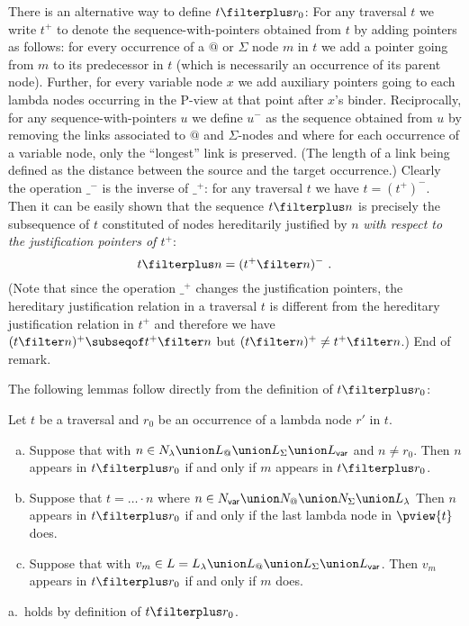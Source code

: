 \begin{remark}
\label{rem:tplus} There is an alternative way to define $t \filterplus r_0$: For any traversal $t$ we write $t^+$ to denote the sequence-with-pointers obtained from $t$ by adding pointers as follows: for every occurrence of a $@$ or $\Sigma$ node $m$ in $t$ we add a pointer going from $m$ to its predecessor in $t$ (which is necessarily an occurrence of its parent node). Further, for every variable node $x$ we add auxiliary pointers going to each lambda nodes occurring in the P-view at that point after $x$'s binder. Reciprocally, for any sequence-with-pointers $u$ we define $u^-$ as the sequence obtained from $u$ by removing the links associated to $@$ and $\Sigma$-nodes and where for each occurrence of a variable node, only the ``longest'' link is preserved. (The length of a link being defined as the distance between the source and the target occurrence.) Clearly the operation $\_^-$ is the inverse of $\_^+$: for any traversal $t$ we have $t= (t^+)^-$. 
Then it can be easily shown that the sequence $t \filterplus n$ is
precisely the subsequence of $t$ constituted of nodes hereditarily
justified by $n$ \emph{with respect to the justification pointers of
$t^+$}:
$$t \filterplus n = (t^+ \filter n)^- \ .$$
(Note that since the operation $\_^+$ changes the justification pointers, the hereditary justification relation in a traversal $t$ is different from the hereditary justification relation in $t^+$ and therefore we have $(t\filter n)^+ \subseqof t^+ \filter n$ but $(t\filter n)^+ \neq t^+ \filter n$.) End of remark.
\end{remark}
\bigskip


The following lemmas follow directly from the definition of
$t\filterplus r_0$:
\begin{lemma}
\label{lem:ifin_projplus_so_does_justifier} Let $t$ be a traversal
and  $r_0$ be an occurrence of a lambda node $r'$ in $t$.
\begin{enumerate}[a.]
  \item Suppose that  with $n \in N_\lambda \union L_@ \union L_\Sigma \union L_{\sf
var}$ and $n \neq r_0$. Then $n$ appears in $t\filterplus r_0$ if
and only if $m$ appears in $t\filterplus r_0$.

  \item Suppose that $t = \ldots \cdot n$ where $n\in N_{\sf var}\union N_@\union
N_\Sigma\union L_\lambda$
    Then $n$ appears in $t\filterplus r_0$ if and only if the
    last lambda node in $\pview{t}$ does.

    \item Suppose that  with $v_m \in L = L_\lambda \union L_@ \union L_\Sigma \union L_{\sf
var}$. Then $v_m$ appears in $t\filterplus r_0$ if and only if
$m$ does.
\end{enumerate}
\end{lemma}
\proof a.\ holds by definition of $t\filterplus r_0$.

